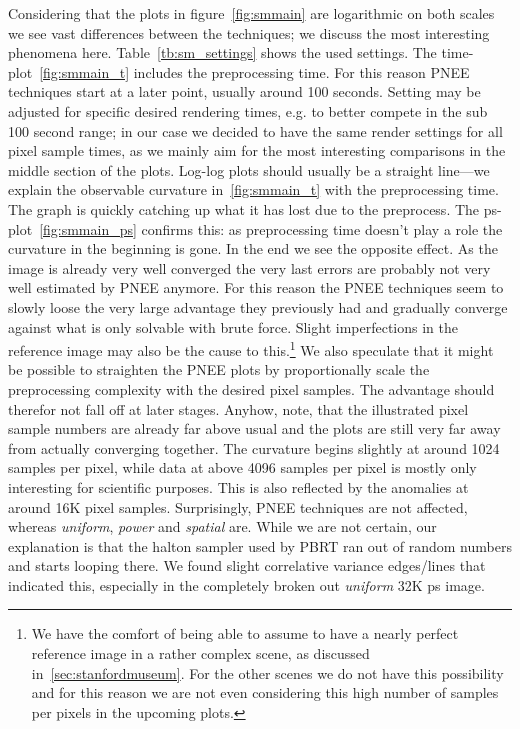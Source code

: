 Considering that the plots in figure~\ref{fig:smmain} are logarithmic on both scales we see vast differences between the techniques; we discuss the most interesting phenomena here. Table~\ref{tb:sm_settings} shows the used settings. The time-plot~\ref{fig:smmain_t} includes the preprocessing time. For this reason PNEE techniques start at a later point, usually around 100 seconds. Setting may be adjusted for specific desired rendering times, e.g. to better compete in the sub 100 second range; in our case we decided to have the same render settings for all pixel sample times, as we mainly aim for the most interesting comparisons in the middle section of the plots. Log-log plots should usually be a straight line---we explain the observable curvature in~\ref{fig:smmain_t} with the preprocessing time. The graph is quickly catching up what it has lost due to the preprocess. The ps-plot~\ref{fig:smmain_ps} confirms this: as preprocessing time doesn't play a role the curvature in the beginning is gone. In the end we see the opposite effect. As the image is already very well converged the very last errors are probably not very well estimated by PNEE anymore. For this reason the PNEE techniques seem to slowly loose the very large advantage they previously had and gradually converge against what is only solvable with brute force. Slight imperfections in the reference image may also be the cause to this.\footnote{We have the comfort of being able to assume to have a nearly perfect reference image in a rather complex scene, as discussed in~\ref{sec:stanfordmuseum}. For the other scenes we do not have this possibility and for this reason we are not even considering this high number of samples per pixels in the upcoming plots.} We also speculate that it might be possible to straighten the PNEE plots by proportionally scale the preprocessing complexity with the desired pixel samples. The advantage should therefor not fall off at later stages. Anyhow, note, that the illustrated pixel sample numbers are already far above usual and the plots are still very far away from actually converging together. The curvature begins slightly at around 1024 samples per pixel, while data at above 4096 samples per pixel is mostly only interesting for scientific purposes. This is also reflected by the anomalies at around 16K pixel samples. Surprisingly, PNEE techniques are not affected, whereas \textit{uniform}, \textit{power} and \textit{spatial} are. While we are not certain, our explanation is that the halton sampler used by PBRT ran out of random numbers and starts looping there. We found slight correlative variance edges/lines that indicated this, especially in the completely broken out \textit{uniform} 32K ps image.

